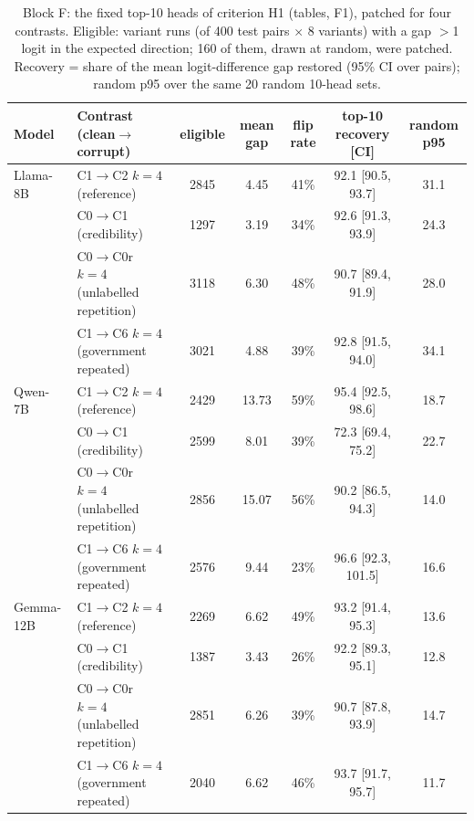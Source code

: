 \begin{table}[!htbp]\centering\scriptsize\setlength{\tabcolsep}{3pt}\begin{tabular}{@{}llccccc@{}}\toprule
Model & Contrast (clean$\to$corrupt) & eligible & mean gap & flip rate & top-10 recovery [CI] & random p95 \\ \midrule
Llama-8B & C1$\to$C2 $k{=}4$ (reference) & 2845 & 4.45 & 41\% & 92.1 [90.5, 93.7] & 31.1 \\
 & C0$\to$C1 (credibility) & 1297 & 3.19 & 34\% & 92.6 [91.3, 93.9] & 24.3 \\
 & C0$\to$C0r $k{=}4$ (unlabelled repetition) & 3118 & 6.30 & 48\% & 90.7 [89.4, 91.9] & 28.0 \\
 & C1$\to$C6 $k{=}4$ (government repeated) & 3021 & 4.88 & 39\% & 92.8 [91.5, 94.0] & 34.1 \\ \midrule
Qwen-7B & C1$\to$C2 $k{=}4$ (reference) & 2429 & 13.73 & 59\% & 95.4 [92.5, 98.6] & 18.7 \\
 & C0$\to$C1 (credibility) & 2599 & 8.01 & 39\% & 72.3 [69.4, 75.2] & 22.7 \\
 & C0$\to$C0r $k{=}4$ (unlabelled repetition) & 2856 & 15.07 & 56\% & 90.2 [86.5, 94.3] & 14.0 \\
 & C1$\to$C6 $k{=}4$ (government repeated) & 2576 & 9.44 & 23\% & 96.6 [92.3, 101.5] & 16.6 \\ \midrule
Gemma-12B & C1$\to$C2 $k{=}4$ (reference) & 2269 & 6.62 & 49\% & 93.2 [91.4, 95.3] & 13.6 \\
 & C0$\to$C1 (credibility) & 1387 & 3.43 & 26\% & 92.2 [89.3, 95.1] & 12.8 \\
 & C0$\to$C0r $k{=}4$ (unlabelled repetition) & 2851 & 6.26 & 39\% & 90.7 [87.8, 93.9] & 14.7 \\
 & C1$\to$C6 $k{=}4$ (government repeated) & 2040 & 6.62 & 46\% & 93.7 [91.7, 95.7] & 11.7 \\
\bottomrule\end{tabular}\caption{Block F: the fixed top-10 heads of criterion H1 (tables, F1), patched for four contrasts. Eligible: variant runs (of 400 test pairs $\times$ 8 variants) with a gap $>$1 logit in the expected direction; 160 of them, drawn at random, were patched. Recovery = share of the mean logit-difference gap restored (95\% CI over pairs); random p95 over the same 20 random 10-head sets.}\end{table}
